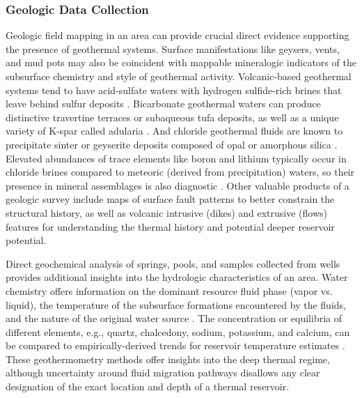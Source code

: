 \subsubsection{Geologic Data Collection}
Geologic field mapping in an area can provide crucial direct evidence supporting the presence of geothermal systems. Surface manifestations like geysers, vents, and mud pots may also be coincident with mappable mineralogic indicators of the subsurface chemistry and style of geothermal activity.  Volcanic-based geothermal systems tend to have acid-sulfate waters with hydrogen sulfide-rich brines that leave behind sulfur deposits \citep[p.\ 123]{glassley_geothermal_2015}. Bicarbonate geothermal waters can produce distinctive travertine terraces or subaqueous tufa deposits, as well as a unique variety of K-spar called adularia \citep[p.\ 125]{glassley_geothermal_2015}. And chloride geothermal fluids are known to precipitate sinter or geyserite deposits composed of opal or amorphous silica \citep[p.\ 125]{glassley_geothermal_2015}. Elevated abundances of trace elements like boron and lithium typically occur in chloride brines compared to meteoric (derived from precipitation) waters, so their presence in mineral assemblages is also diagnostic \citep{bielicki_hydrogeolgic_2015, millot_multi-isotopic_2007}. Other valuable products of a geologic survey include maps of surface fault patterns to better constrain the structural history, as well as volcanic intrusive (dikes) and extrusive (flows) features for understanding the thermal history and potential deeper reservoir potential.

Direct geochemical analysis of springs, pools, and samples collected from wells provides additional insights into the hydrologic characteristics of an area. Water chemistry offers information on the dominant resource fluid phase (vapor vs. liquid), the temperature of the subsurface formations encountered by the fluids, and the nature of the original water source \citep[p.\ 25]{dipippo_geothermal_2012}. The concentration or equilibria of different elements, e.g., quartz, chalcedony, sodium, potassium, and calcium, can be compared to empirically-derived trends for reservoir temperature estimates \citep[p.\ 157]{glassley_geothermal_2015}. These geothermometry methods offer insights into the deep thermal regime, although uncertainty around fluid migration pathways disallows any clear designation of the exact location and depth of a thermal reservoir.

